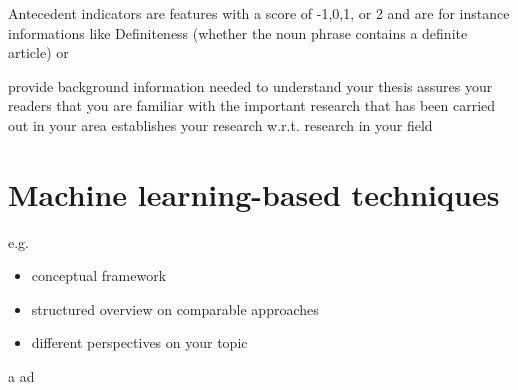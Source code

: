 Antecedent indicators are features with a score of -1,0,1, or 2 and are for instance informations like Definiteness (whether the noun phrase contains a definite article) or 

provide background information needed to understand your thesis
assures your readers that you are familiar with the important research that has been carried out in your area
establishes your research w.r.t. research in your field


\section{Machine learning-based techniques}


e.g.\
\begin{itemize}
  \item conceptual framework
  \item structured overview on comparable approaches
  \item different perspectives on your topic
\end{itemize}

 a\cite{lin1973} ad